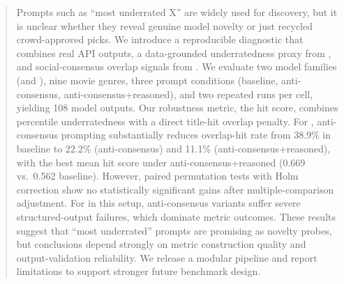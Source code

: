\begin{abstract}
Prompts such as ``most underrated X'' are widely used for discovery, but it is unclear whether they reveal genuine model novelty or just recycled crowd-approved picks. We introduce a reproducible diagnostic that combines real API outputs, a data-grounded underratedness proxy from \movielens, and social-consensus overlap signals from \reddit. We evaluate two model families (\gptfourone and \gptfive), nine movie genres, three prompt conditions (baseline, anti-consensus, anti-consensus+reasoned), and two repeated runs per cell, yielding 108 model outputs. Our robustness metric, the \uns hit score, combines percentile underratedness with a direct title-hit overlap penalty. For \gptfourone, anti-consensus prompting substantially reduces overlap-hit rate from 38.9\% in baseline to 22.2\% (anti-consensus) and 11.1\% (anti-consensus+reasoned), with the best mean \uns hit score under anti-consensus+reasoned (0.669 vs.\ 0.562 baseline). However, paired permutation tests with Holm correction show no statistically significant gains after multiple-comparison adjustment. For \gptfive in this setup, anti-consensus variants suffer severe structured-output failures, which dominate metric outcomes. These results suggest that ``most underrated'' prompts are promising as novelty probes, but conclusions depend strongly on metric construction quality and output-validation reliability. We release a modular pipeline and report limitations to support stronger future benchmark design.
\end{abstract}
